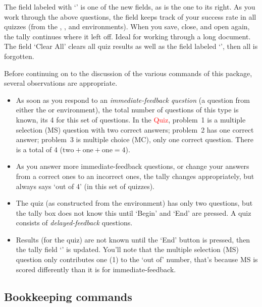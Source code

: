\documentclass{article}
\begin{document}
\hfill{}\enspace\sooField{1in}{11bp}\cgBdry\clearAllField{}{11bp}\vcgBdry[12pt]
The field labeled with `' is one of the new fields, as is the one
to its right. As you work through the above questions, the field keeps track
of your success rate in all quizzes (from the ,
, and  environments). When you save, close, and open
again, the tally continues where it left off. Ideal for working through a
long document. The field `\textsf{Clear All}' clears all quiz results as well as
the field labeled `', then all is forgotten.

Before continuing on to the discussion of the various commands of this
package, several observations are appropriate.
\begin{itemize}
  \item As soon as you respond to an \emph{immediate-feedback question} (a question
      from either the  or  environment), the
      total number of questions of this type is known, its 4 for this set of
      questions. In the \textcolor{red}{Quiz}, problem~1 is a multiple
      selection (MS) question with two correct answers; problem~2 has one correct
      answer; problem~3 is multiple choice (MC), only one correct question.
      There is a total of 4 ($\text{two}+\text{one}+\text{one}=4$).
  \item As you answer more immediate-feedback questions, or change your
      answers from a correct ones to an incorrect ones, the tally changes
      appropriately, but always says `out of 4' (in this set of quizzes).
  \item The quiz (as constructed from the  environment) has only
      two questions, but the tally box does not know this until
      `\textsf{Begin}' and `\textsf{End}' are pressed. A quiz consists of
      \emph{delayed-feedback} questions.

  \item Results (for the quiz) are not known until the `\textsf{End}' button
      is pressed, then the tally field `' is updated. You'll note
      that the multiple selection (MS) question only contributes one (1) to
      the `out of' number, that's because MS is scored differently than it is
      for immediate-feedback.

\end{itemize}

\subsection{Bookkeeping commands}\previewOff
\end{document}
